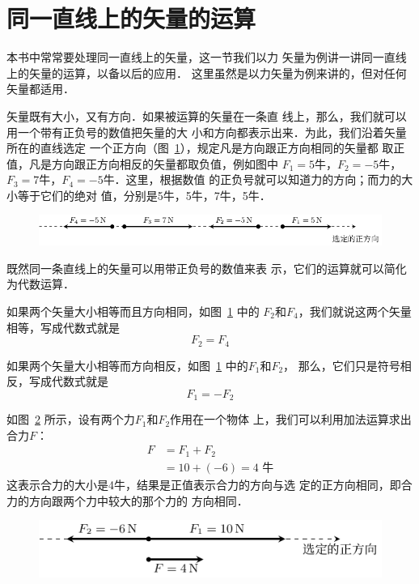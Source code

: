 \section{同一直线上的矢量的运算} 
    本书中常常要处理同一直线上的矢量，这一节我们以力
矢量为例讲一讲同一直线上的矢量的运算，以备以后的应用．
这里虽然是以力矢量为例来讲的，但对任何矢量都适用．

    矢量既有大小，又有方向．如果被运算的矢量在一条直
线上，那么，我们就可以用一个带有正负号的数值把矢量的大
小和方向都表示出来．为此，我们沿着矢量所在的直线选定
一个正方向（图~\ref{fig_A_1-33}），规定凡是方向跟正方向相同的矢量都
取正值，凡是方向跟正方向相反的矢量都取负值，例如图中
$F_1=5$牛，$F_2=-5$牛，$F_3=7$牛，$F_4=-5$牛．这里，根据数值
的正负号就可以知道力的方向；而力的大小等于它们的绝对
值，分别是5牛，5牛，7牛，5牛．

\begin{figure} [htp]
\centering
\includegraphics{fig/A/1-33.pdf} 
\caption{} \label{fig_A_1-33} 
\end{figure} 

既然同一条直线上的矢量可以用带正负号的数值来表
示，它们的运算就可以简化为代数运算．

    如果两个矢量大小相等而且方向相同，如图~\ref{fig_A_1-33} 中的
$F_2$和$F_4$，我们就说这两个矢量相等，写成代数式就是
\begin{equation} 
F_2=F_4
\end{equation} 

    如果两个矢量大小相等而方向相反，如图~\ref{fig_A_1-33} 中的$F_1$和$F_2$，
那么，它们只是符号相反，写成代数式就是
\begin{equation} 
F_1=-F_2
\end{equation} 

    如图~\ref{fig_A_1-34} 所示，设有两个力$F_1$和$F_2$作用在一个物体
上，我们可以利用加法运算求出合力$F$：
\begin{equation}\label{eq-A-1.5}
\begin{split} 
F&=F_1+F_2\\
&=10+(-6)=4\text{ 牛} 
\end{split} 
\end{equation} 
这表示合力的大小是4牛，结果是正值表示合力的方向与选
定的正方向相同，即合力的方向跟两个力中较大的那个力的
方向相同．

\begin{figure} [htp]
\centering
\includegraphics{fig/A/1-34.pdf} 
\caption{} \label{fig_A_1-34} 
\end{figure} 

